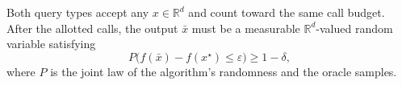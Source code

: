 \documentclass[10pt]{article}
\theoremstyle{definition}
\begin{document}
Both query types accept any $x\in\mathbb{R}^d$ and count toward the same call budget. After the allotted calls, the output $\bar{x}$ must be a measurable $\mathbb{R}^d$-valued random variable satisfying
\[
P\bigl(f(\bar{x})-f(x^\star)\leq\varepsilon\bigr)\geq 1-\delta,
\]
where $P$ is the joint law of the algorithm's randomness and the oracle samples.
\end{document}
